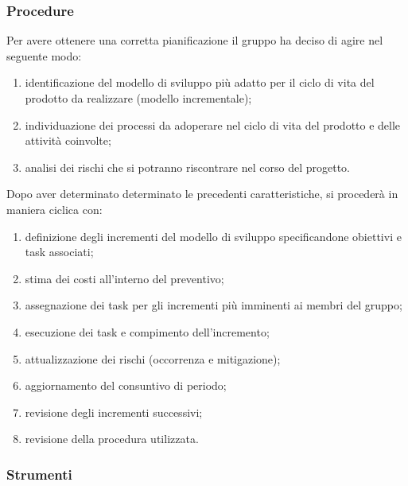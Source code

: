 \subsubsection{Procedure}
Per avere ottenere una corretta pianificazione il gruppo ha deciso di agire nel seguente modo:
\begin{enumerate}
	\item identificazione del modello di sviluppo più adatto per il ciclo di vita del prodotto da realizzare (modello incrementale);
	\item individuazione dei processi da adoperare nel ciclo di vita del prodotto e delle attività coinvolte;
	\item analisi dei rischi che si potranno riscontrare nel corso del progetto.
\end{enumerate}
Dopo aver determinato determinato le precedenti caratteristiche, si procederà in maniera ciclica con:
\begin{enumerate}
	\item definizione degli incrementi del modello di sviluppo specificandone obiettivi e task associati;
	\item stima dei costi all'interno del preventivo;
	\item assegnazione dei task per gli incrementi più imminenti ai membri del gruppo;
	\item esecuzione dei task e compimento dell'incremento;
	\item attualizzazione dei rischi (occorrenza e mitigazione);
	\item aggiornamento del consuntivo di periodo;
	\item revisione degli incrementi successivi;
	\item revisione della procedura utilizzata.
\end{enumerate}



\subsubsection{Strumenti}
